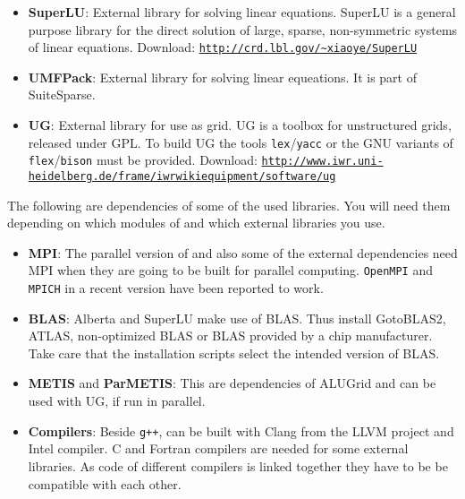\begin{itemize}
\item \textbf{SuperLU}: External library for solving linear equations. SuperLU is a general purpose
  library for the direct solution of large, sparse, non-symmetric systems of linear equations.
  Download: \texttt{\url{http://crd.lbl.gov/~xiaoye/SuperLU}}

\item \textbf{UMFPack}: External library for solving linear equeations. It is part of SuiteSparse.

\item \textbf{UG}: External library for use as grid. UG is a toolbox for unstructured grids, released under GPL.
  To build UG the tools \texttt{lex}/\texttt{yacc} or the GNU variants of \texttt{flex}/\texttt{bison} must be provided.
  Download: \texttt{\url{http://www.iwr.uni-heidelberg.de/frame/iwrwikiequipment/software/ug}}
\end{itemize}

The following are dependencies of some of the used libraries. You will need them
depending on which modules of \Dune and which external libraries you use.

\begin{itemize}
\item \textbf{MPI}: The parallel version of \Dune and also some of the external dependencies need MPI
  when they are going to be built for parallel computing. \texttt{OpenMPI} and \texttt{MPICH} in a recent
  version have been reported to work.

\item \textbf{BLAS}: Alberta and SuperLU make use of BLAS. Thus install GotoBLAS2, ATLAS, non-optimized BLAS
  or BLAS provided by a chip manufacturer. Take care that the installation scripts select the intended
  version of BLAS.

\item \textbf{METIS} and \textbf{ParMETIS}: This are dependencies of ALUGrid and can be used with UG, if run in parallel.

\item \textbf{Compilers}: Beside \texttt{g++}, \Dune can be built with Clang from the LLVM project and
  Intel \Cplusplus compiler. C and Fortran compilers are needed for some external libraries. As code of
  different compilers is linked together they have to be be compatible with each other.
\end{itemize}